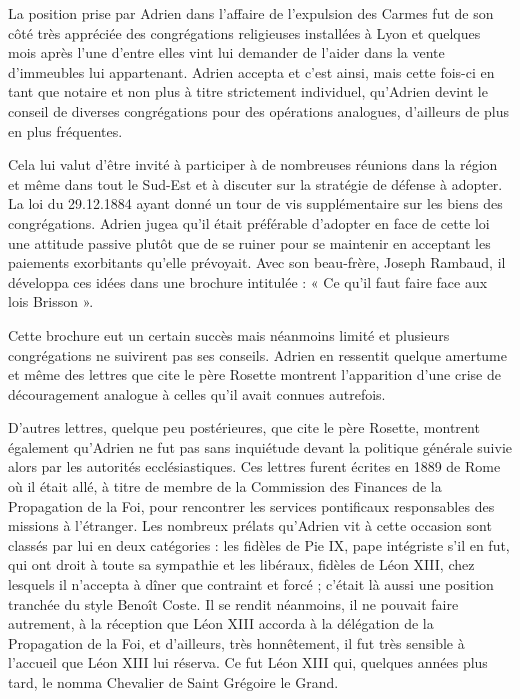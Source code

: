 \documentclass[11pt,a4paper]{report}
\begin{document}
La position prise par Adrien dans l'affaire de l'expulsion des Carmes fut de son côté très appréciée des congrégations religieuses installées à Lyon et quelques mois après l'une d'entre elles vint lui demander de l'aider dans la vente d'immeubles lui appartenant. Adrien accepta et c'est ainsi, mais cette fois-ci en tant que notaire et non plus à titre strictement individuel, qu'Adrien devint le conseil de diverses congrégations pour des opérations analogues, d'ailleurs de plus en plus fréquentes.

Cela lui valut d'être invité à participer à de nombreuses réunions dans la région et même dans tout le Sud-Est et à discuter sur la stratégie de défense à adopter. La loi du 29.12.1884 ayant donné un tour de vis supplémentaire sur les biens des congrégations. Adrien jugea qu'il était préférable d'adopter en face de cette loi une attitude passive plutôt que de se ruiner pour se maintenir en acceptant les paiements exorbitants qu'elle prévoyait. Avec son beau-frère, Joseph Rambaud, il développa ces idées dans une brochure intitulée : « Ce qu'il faut faire face aux lois Brisson ».

Cette brochure eut un certain succès mais néanmoins limité et plusieurs congrégations ne suivirent pas ses conseils. Adrien en ressentit quelque amertume et même des lettres que cite le père Rosette montrent l'apparition d'une crise de découragement analogue à celles qu'il avait connues autrefois.

D'autres lettres, quelque peu postérieures, que cite le père Rosette, montrent également qu'Adrien ne fut pas sans inquiétude devant la politique générale suivie alors par les autorités ecclésiastiques. Ces lettres furent écrites en 1889 de Rome où il était allé, à titre de membre de la Commission des Finances de la Propagation de la Foi, pour rencontrer les services pontificaux responsables des missions à l'étranger. Les nombreux prélats qu'Adrien vit à cette occasion sont classés par lui en deux catégories : les fidèles de Pie IX, pape intégriste s'il en fut, qui ont droit à toute sa sympathie et les libéraux, fidèles de Léon XIII, chez lesquels il n'accepta à dîner que contraint et forcé ; c'était là aussi une position tranchée du style Benoît Coste. Il se rendit néanmoins, il ne pouvait faire autrement, à la réception que Léon XIII accorda à la délégation de la Propagation de la Foi, et d'ailleurs, très honnêtement, il fut très sensible à l'accueil que Léon XIII lui réserva. Ce fut Léon XIII qui, quelques années plus tard, le nomma Chevalier de Saint Grégoire le Grand.
\end{document}
